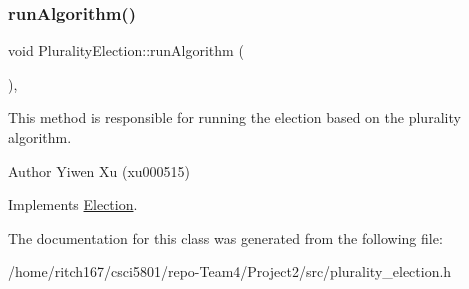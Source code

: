 \mbox{\label{classPluralityElection_a9517806e8ba40496c49013acc7ad9ca5}} 
\subsubsection{\texorpdfstring{run\+Algorithm()}{runAlgorithm()}}
{\footnotesize\ttfamily void Plurality\+Election\+::run\+Algorithm (\begin{DoxyParamCaption}{ }\end{DoxyParamCaption})\hspace{0.3cm}{\ttfamily [override]}, {\ttfamily [virtual]}}

This method is responsible for running the election based on the plurality algorithm. \begin{DoxyAuthor}{Author}
Yiwen Xu (xu000515) 
\end{DoxyAuthor}


Implements \hyperlink{classElection_a059659576ebb0416ecd8005f684461d6}{Election}.



The documentation for this class was generated from the following file\+:\begin{DoxyCompactItemize}
\item 
/home/ritch167/csci5801/repo-\/\+Team4/\+Project2/src/plurality\+\_\+election.\+h\end{DoxyCompactItemize}
